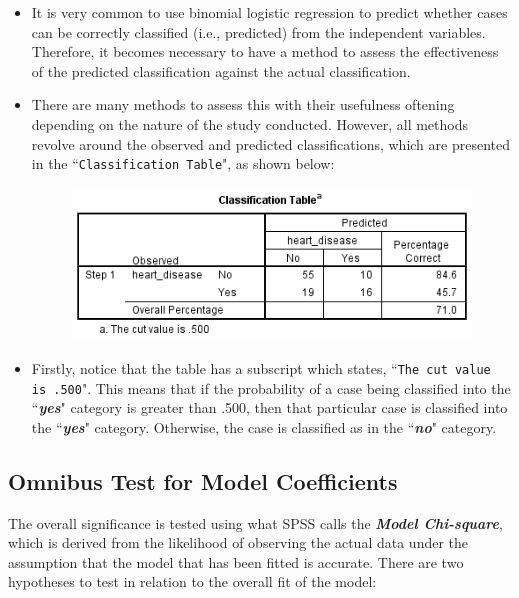 \documentclass[a4paper,12pt]{article}
\begin{document}
\begin{itemize}
	\item It is very common to use binomial logistic regression to predict whether cases can be correctly classified (i.e., predicted) from the independent variables. Therefore, it becomes necessary to have a method to assess the effectiveness of the predicted classification against the actual classification.
	\item  There are many methods to assess this with their usefulness oftening depending on the nature of the study conducted. However, all methods revolve around the observed and predicted classifications, which are presented in the ``\texttt{Classification Table}", as shown below:
	
	
	\begin{figure}
		\centering
		\includegraphics[width=0.8\linewidth]{images/BLogReg-Table}
	\end{figure}
	
	
	
	\item Firstly, notice that the table has a subscript which states, ``\texttt{The cut value is .500}". This means that if the probability of a case being classified into the ``\textbf{\textit{yes}}" category is greater than .500, then that particular case is classified into the ``\textbf{\textit{yes}}" category. 
	Otherwise, the case is classified as in the ``\textbf{\textit{no}}" category. 
\end{itemize}




\subsection{Omnibus Test for Model Coefficients}
The overall significance is tested using what SPSS calls the \textbf{\textit{Model Chi-square}}, which is derived from the likelihood of observing the actual data under the assumption that the model that has been fitted is accurate. There are two hypotheses to test in relation to the overall fit of the model:
\end{document}
